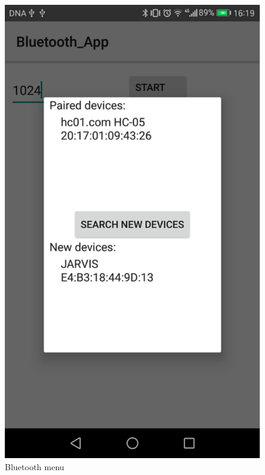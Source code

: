 \documentclass[a4paper, 11pt]{report}
\begin{document}
\begin{figure}[ht]
\begin{minipage}[t]{0.4\textwidth}
		\includegraphics[scale=0.4]{images/app3layout.pdf}
		\caption{Bluetooth menu}\label{fig:btmenu}
	\end{minipage}
\end{figure}
\end{document}
